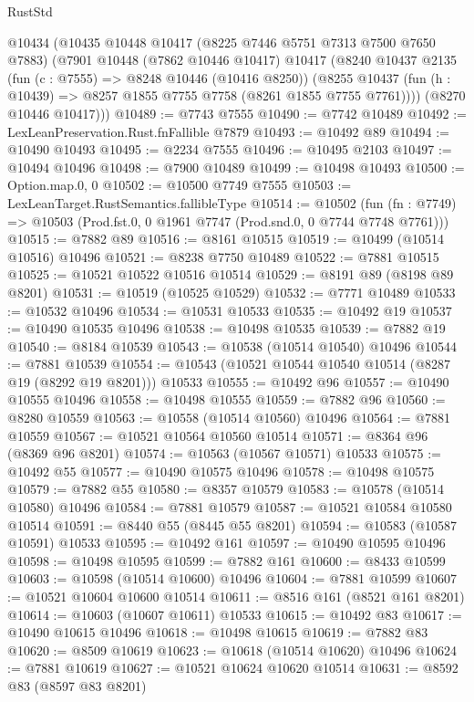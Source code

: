 \begin{lexlean}{RustStd}
\begin{coremodule}
  @10434
    (@10435
      @10448
      @10417
      (@8225 @7446 @5751 @7313 @7500 @7650 @7883)
      (@7901
        @10448
        (@7862 @10446 @10417)
        @10417
        (@8240
          @10437
          @2135
          (fun (c : @7555) => @8248 @10446 (@10416 @8250))
          (@8255 @10437 (fun (h : @10439) => @8257 @1855 @7755 @7758 (@8261 @1855 @7755 @7761))))
        (@8270 @10446 @10417)))
@10489 := @7743 @7555
@10490 := @7742 @10489
@10492 := LexLeanPreservation.Rust.fnFallible @7879
@10493 := @10492 @89
@10494 := @10490 @10493
@10495 := @2234 @7555
@10496 := @10495 @2103
@10497 := @10494 @10496
@10498 := @7900 @10489
@10499 := @10498 @10493
@10500 := Option.map.{0, 0}
@10502 := @10500 @7749 @7555
@10503 := LexLeanTarget.RustSemantics.fallibleType
@10514 := @10502
    (fun (fn : @7749) => @10503 (Prod.fst.{0, 0} @1961 @7747 (Prod.snd.{0, 0} @7744 @7748 @7761)))
@10515 := @7882 @89
@10516 := @8161 @10515
@10519 := @10499 (@10514 @10516) @10496
@10521 := @8238 @7750 @10489
@10522 := @7881 @10515
@10525 := @10521 @10522 @10516 @10514
@10529 := @8191 @89 (@8198 @89 @8201)
@10531 := @10519 (@10525 @10529)
@10532 := @7771 @10489
@10533 := @10532 @10496
@10534 := @10531 @10533
@10535 := @10492 @19
@10537 := @10490 @10535 @10496
@10538 := @10498 @10535
@10539 := @7882 @19
@10540 := @8184 @10539
@10543 := @10538 (@10514 @10540) @10496
@10544 := @7881 @10539
@10554 := @10543 (@10521 @10544 @10540 @10514 (@8287 @19 (@8292 @19 @8201))) @10533
@10555 := @10492 @96
@10557 := @10490 @10555 @10496
@10558 := @10498 @10555
@10559 := @7882 @96
@10560 := @8280 @10559
@10563 := @10558 (@10514 @10560) @10496
@10564 := @7881 @10559
@10567 := @10521 @10564 @10560 @10514
@10571 := @8364 @96 (@8369 @96 @8201)
@10574 := @10563 (@10567 @10571) @10533
@10575 := @10492 @55
@10577 := @10490 @10575 @10496
@10578 := @10498 @10575
@10579 := @7882 @55
@10580 := @8357 @10579
@10583 := @10578 (@10514 @10580) @10496
@10584 := @7881 @10579
@10587 := @10521 @10584 @10580 @10514
@10591 := @8440 @55 (@8445 @55 @8201)
@10594 := @10583 (@10587 @10591) @10533
@10595 := @10492 @161
@10597 := @10490 @10595 @10496
@10598 := @10498 @10595
@10599 := @7882 @161
@10600 := @8433 @10599
@10603 := @10598 (@10514 @10600) @10496
@10604 := @7881 @10599
@10607 := @10521 @10604 @10600 @10514
@10611 := @8516 @161 (@8521 @161 @8201)
@10614 := @10603 (@10607 @10611) @10533
@10615 := @10492 @83
@10617 := @10490 @10615 @10496
@10618 := @10498 @10615
@10619 := @7882 @83
@10620 := @8509 @10619
@10623 := @10618 (@10514 @10620) @10496
@10624 := @7881 @10619
@10627 := @10521 @10624 @10620 @10514
@10631 := @8592 @83 (@8597 @83 @8201)

\end{coremodule}
\end{lexlean}
